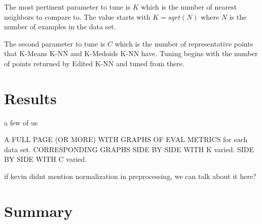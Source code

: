 \documentclass[twoside,11pt]{article}
\begin{document}
The most pertinent parameter to tune is $K$ which is the number of nearest neighbors to compare to. The value starts with $K = sqrt(N)$ where $N$ is the number of examples in the data set. 

The second parameter to tune is $C$ which is the number of representative points that K-Means K-NN and K-Medoids K-NN have. Tuning begins with the number of points returned by Edited K-NN and tuned from there. 

\section{Results}

a few of us

A FULL PAGE (OR MORE) WITH GRAPHS OF EVAL METRICS for each data set. CORRESPONDING GRAPHS SIDE BY SIDE WITH K varied. SIDE BY SIDE WITH C varied.

if kevin didnt mention normalization in preprocessing, we can talk about it here?

\section{Summary}




\end{document}
